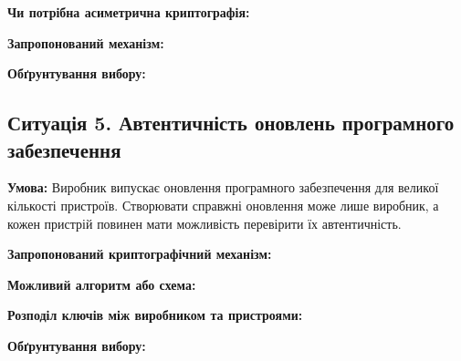 \textbf{Чи потрібна асиметрична криптографія:}

\textbf{Запропонований механізм:}

\textbf{Обґрунтування вибору:}

\subsection{Ситуація 5. Автентичність оновлень програмного забезпечення}

\textbf{Умова:} Виробник випускає оновлення програмного забезпечення для великої кількості пристроїв. Створювати справжні оновлення може лише виробник, а кожен пристрій повинен мати можливість перевірити їх автентичність.

\textbf{Запропонований криптографічний механізм:}

\textbf{Можливий алгоритм або схема:}

\textbf{Розподіл ключів між виробником та пристроями:}

\textbf{Обґрунтування вибору:}